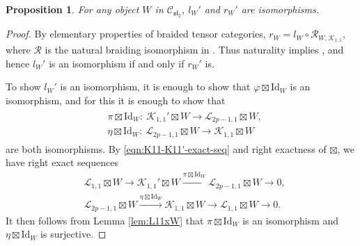 \documentclass[pdftex]{sigma}
\numberwithin{equation}{section}
\newtheorem{Proposition}[Theorem]{Proposition}
\theoremstyle{definition}
\begin{document}
\begin{Proposition}\label{prop:K11'xW}
For any object $W$ in $\mathcal{C}_{\mathfrak{sl}_2}$, $l_W'$ and $r_W'$ are isomorphisms.
\end{Proposition}
\begin{proof}
By elementary properties of braided tensor categories, $r_W=l_W\circ\mathcal{R}_{W,\mathcal{K}_{1,1}}$, where $\mathcal{R}$ is the natural braiding isomorphism in . Thus naturality implies , and hence $l_W'$ is an isomorphism if and only if $r_W'$ is.

To show $l_W'$ is an isomorphism, it is enough to show that $\varphi\boxtimes\mathrm{Id}_W$ is an isomorphism, and for this it is enough to show that
\begin{gather*}
\begin{split}
& \pi\boxtimes\mathrm{Id}_W\colon \ \mathcal{K}_{1,1}'\boxtimes W\longrightarrow\mathcal{L}_{2p-1,1}\boxtimes W,\\
& \eta\boxtimes\mathrm{Id}_W\colon \ \mathcal{L}_{2p-1,1}\boxtimes W\longrightarrow\mathcal{K}_{1,1}\boxtimes W
\end{split}
\end{gather*}
are both isomorphisms. By \eqref{eqn:K11-K11'-exact-seq} and right exactness of $\boxtimes$, we have right exact sequences
\begin{align*}
&\mathcal{L}_{1,1}\boxtimes W\longrightarrow\mathcal{K}_{1,1}'\boxtimes W\xrightarrow{\pi\boxtimes\mathrm{Id}_W} \mathcal{L}_{2p-1,1}\boxtimes W\longrightarrow 0,\\
& \mathcal{L}_{2p-1,1}\boxtimes W\xrightarrow{\eta\boxtimes\mathrm{Id}_W} \mathcal{K}_{1,1}\boxtimes W\longrightarrow\mathcal{L}_{1,1}\boxtimes W\longrightarrow 0.
\end{align*}
It then follows from Lemma \ref{lem:L11xW} that $\pi\boxtimes\mathrm{Id}_W$ is an isomorphism and $\eta\boxtimes\mathrm{Id}_W$ is surjective.


\end{proof}
\end{document}
